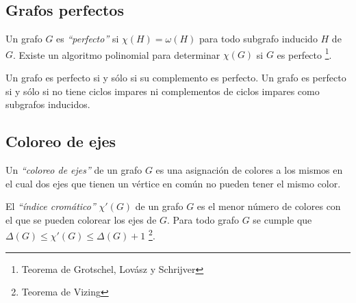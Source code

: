 \subsection{Grafos perfectos}

Un grafo $G$ es \emph{``perfecto''} si $\chi(H) = \omega(H)$ para todo subgrafo inducido $H$ de $G$. Existe un algoritmo polinomial para determinar $\chi(G)$ si $G$ es perfecto \footnote{Teorema de Grotschel, Lov\'asz y Schrijver}.

Un grafo es perfecto si y s\'olo si su complemento es perfecto. Un grafo es perfecto si y s\'olo si no tiene ciclos impares ni complementos de ciclos impares como subgrafos inducidos.

\subsection{Coloreo de ejes}

Un \emph{``coloreo de ejes''} de un grafo $G$ es una asignaci\'on de colores a los mismos en el cual dos ejes que tienen un v\'ertice en com\'un no pueden tener el mismo color.

El \emph{``\'indice crom\'atico''} $\chi'(G)$ de un grafo $G$ es el menor n\'umero de colores con el que se pueden colorear los ejes de $G$. Para todo grafo $G$ se cumple que $\Delta(G) \leq \chi'(G) \leq \Delta(G) + 1$ \footnote{Teorema de Vizing}.

